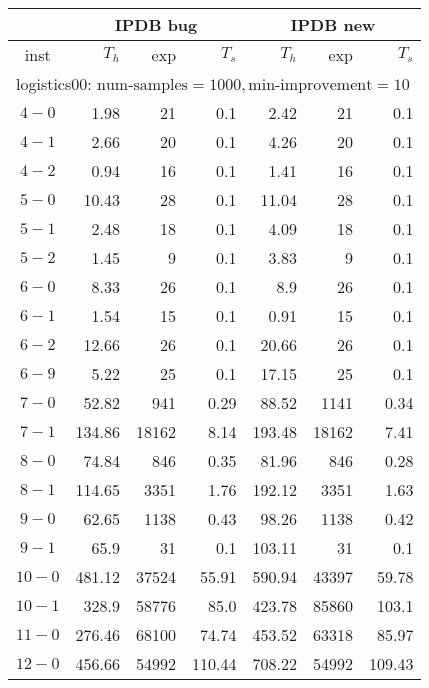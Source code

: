\begin{longtable}{|c||r|r|r||r|r|r|}\firsthline
& \multicolumn{3}{c||}{IPDB bug} & \multicolumn{3}{c||}{IPDB new}\\\hline
inst & $T_h$ & exp & $T_s$ & $T_h$ & exp & $T_s$\\\hline
\multicolumn{7}{|l|}{logistics00: $\text{num-samples}=1000,\text{min-improvement}=10$}\\\hline
$4-0$ & 1.98 & 21 & 0.1 &2.42 & 21 & 0.1 \\\hline
$4-1$ & 2.66 & 20 & 0.1 &4.26 & 20 & 0.1 \\\hline
$4-2$ & 0.94 & 16 & 0.1 &1.41 & 16 & 0.1 \\\hline
$5-0$ & 10.43 & 28 & 0.1 &11.04 & 28 & 0.1 \\\hline
$5-1$ & 2.48 & 18 & 0.1 &4.09 & 18 & 0.1 \\\hline
$5-2$ & 1.45 & 9 & 0.1 &3.83 & 9 & 0.1 \\\hline
$6-0$ & 8.33 & 26 & 0.1 &8.9 & 26 & 0.1 \\\hline
$6-1$ & 1.54 & 15 & 0.1 &0.91 & 15 & 0.1 \\\hline
$6-2$ & 12.66 & 26 & 0.1 &20.66 & 26 & 0.1 \\\hline
$6-9$ & 5.22 & 25 & 0.1 &17.15 & 25 & 0.1 \\\hline
$7-0$ & 52.82 & 941 & 0.29 &88.52 & 1141 & 0.34 \\\hline
$7-1$ & 134.86 & 18162 & 8.14 &193.48 & 18162 & 7.41 \\\hline
$8-0$ & 74.84 & 846 & 0.35 &81.96 & 846 & 0.28 \\\hline
$8-1$ & 114.65 & 3351 & 1.76 &192.12 & 3351 & 1.63 \\\hline
$9-0$ & 62.65 & 1138 & 0.43 &98.26 & 1138 & 0.42 \\\hline
$9-1$ & 65.9 & 31 & 0.1 &103.11 & 31 & 0.1 \\\hline
$10-0$ & 481.12 & 37524 & 55.91 &590.94 & 43397 & 59.78 \\\hline
$10-1$ & 328.9 & 58776 & 85.0 &423.78 & 85860 & 103.1 \\\hline
$11-0$ & 276.46 & 68100 & 74.74 &453.52 & 63318 & 85.97 \\\hline
$12-0$ & 456.66 & 54992 & 110.44 &708.22 & 54992 & 109.43 \\\hline


\end{longtable}
